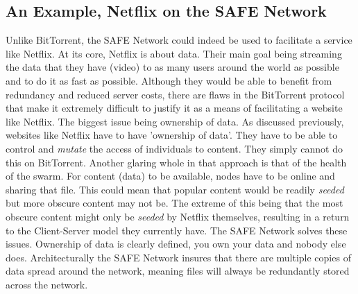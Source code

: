 \subsection{An Example, Netflix on the SAFE Network}

Unlike BitTorrent, the SAFE Network could indeed be used to facilitate a service like Netflix. At its core, Netflix is about data. Their main goal being streaming the data that they have (video) to as many users around the world as possible and to do it as fast as possible. Although they would be able to benefit from redundancy and reduced server costs, there are flaws in the BitTorrent protocol that make it extremely difficult to justify it as a means of facilitating a website like Netflix. The biggest issue being ownership of data. As discussed previously, websites like Netflix have to have 'ownership of data'. They have to be able to control and \textit{mutate} the access of individuals to content. They simply cannot do this on BitTorrent. Another glaring whole in that approach is that of the health of the swarm. For content (data) to be available, nodes have to be online and sharing that file. This could mean that popular content would be readily \textit{seeded} but more obscure content may not be. The extreme of this being that the most obscure content might only be \textit{seeded} by Netflix themselves, resulting in a return to the Client-Server model they currently have. The SAFE Network solves these issues. Ownership of data is clearly defined, you own your data and nobody else does. Architecturally the SAFE Network insures that there are multiple copies of data spread around the network, meaning files will always be redundantly stored across the network. 

